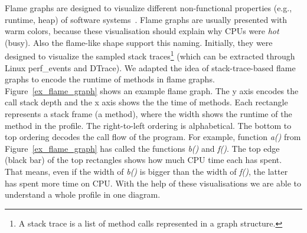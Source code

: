 Flame graphs are designed to visualize different non-functional properties (e.g., runtime, heap) of software systems~\cite{Gregg:2016:FG:2927299.2927301}. Flame graphs are usually presented with warm colors, because these visualisation should explain why CPUs were \textit{hot} (busy). Also the flame-like shape support this naming. Initially, they were designed to visualize the sampled stack traces\footnote{A stack trace is a list of method calls represented in a graph structure.} (which can be extracted through Linux perf\_events and DTrace). We adapted the idea of stack-trace-based flame graphs to encode the runtime of methods in flame graphs. Figure~\ref{ex_flame_graph} shows an example flame graph. The y axis encodes the call stack depth and the x axis shows the the time of methods. Each rectangle represents a stack frame (a method), where the width shows the runtime of the method in the profile. The right-to-left ordering is alphabetical. The bottom to top ordering decodes the call flow of the program. For example, function \textit{a()} from Figure~\ref{ex_flame_graph} has called the functions \textit{b()} and \textit{f()}. The top edge (black bar) of the top rectangles shows how much CPU time each has spent. That means, even if the width of \textit{b()} is bigger than the width of \textit{f()}, the latter has spent more time on CPU. With the help of these visualisations we are able to understand a whole profile in one diagram. 

